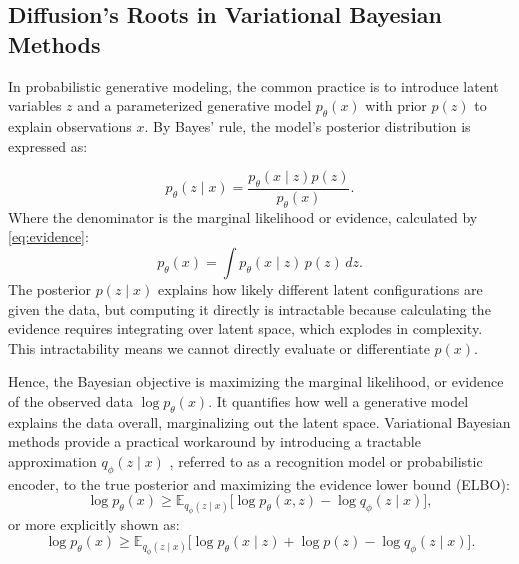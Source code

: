 \subsection{Diffusion’s Roots in Variational Bayesian Methods}
\label{sec:variational_bayes}
In probabilistic generative modeling, the common practice is to introduce latent variables $z$ and a parameterized generative model $p_\theta(x)$ with prior $p(z)$ to explain observations $x$. By Bayes’ rule, the model’s posterior distribution is expressed as:

\begin{equation}
	p_\theta(z \mid x) = \frac{p_\theta(x \mid z) p(z)}{p_\theta(x)}.
	\label{eq:posterior}
\end{equation}
Where the denominator is the marginal likelihood or evidence, calculated by \ref{eq:evidence}:
\begin{equation}
	p_\theta(x) = \int p_\theta(x \mid z)\, p(z)\, dz.
	\label{eq:evidence}
\end{equation}
The posterior $p(z \mid x)$ explains how likely different latent configurations are given the data, but computing it directly is intractable because calculating the evidence requires integrating over latent space, which explodes in complexity. This intractability means we cannot directly evaluate or differentiate  $p(x)$.

Hence, the Bayesian objective is maximizing the marginal likelihood, or evidence of the observed data $\log p_\theta(x)$. It quantifies how well a generative model explains the data overall, marginalizing out the latent space. Variational Bayesian methods provide a practical workaround by introducing a tractable approximation $q_\phi (z \mid x)$ , referred to as a recognition model or probabilistic encoder, to the true posterior and maximizing the evidence lower bound (ELBO)\cite{kingmaAutoEncodingVariationalBayes2022a}:
\begin{equation}
	\log p_{\theta}(x) \geq \mathbb{E}_{q_{\phi}(z \mid x)} \Big[ \log p_\theta(x, z) - \log q_{\phi}(z \mid x) \Big],
	\label{eq:elbo1}
\end{equation}
or more explicitly shown as:
\begin{equation}
	\log p_{\theta}(x)\geq  \mathbb{E}_{q_{\phi}(z \mid x)} \Big[ \log p_{\theta}(x \mid z) + \log p(z) - \log q_{\phi}(z \mid x) \Big].
	\label{eq:elbo2}
\end{equation}


